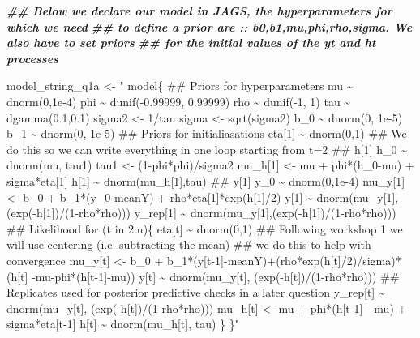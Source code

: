 \documentclass[
]{article}
\newenvironment{Shaded}{\begin{snugshade}}{\end{snugshade}}
\newcommand{\DocumentationTok}[1]{\textcolor[rgb]{0.56,0.35,0.01}{\textbf{\textit{#1}}}}
\newcommand{\NormalTok}[1]{#1}
\newcommand{\OtherTok}[1]{\textcolor[rgb]{0.56,0.35,0.01}{#1}}
\newcommand{\StringTok}[1]{\textcolor[rgb]{0.31,0.60,0.02}{#1}}
\begin{document}
\begin{Shaded}
\begin{Highlighting}[]
\DocumentationTok{\#\# Below we declare our model in JAGS, the hyperparameters for which we need  }
\DocumentationTok{\#\# to define a prior are :: b0,b1,mu,phi,rho,sigma. We also have to set priors}
\DocumentationTok{\#\# for the initial values of the yt and ht processes}
  
\NormalTok{model\_string\_q1a }\OtherTok{\textless{}{-}} \StringTok{" model\{}
\StringTok{  }
\StringTok{  \#\# Priors for hyperparameters}
\StringTok{  }
\StringTok{  mu \textasciitilde{} dnorm(0,1e{-}4)}
\StringTok{  phi \textasciitilde{} dunif({-}0.99999, 0.99999)}
\StringTok{  rho \textasciitilde{} dunif({-}1, 1)}
\StringTok{  }
\StringTok{  }
\StringTok{  tau \textasciitilde{} dgamma(0.1,0.1)}
\StringTok{  sigma2 \textless{}{-} 1/tau}
\StringTok{  sigma \textless{}{-} sqrt(sigma2)}
\StringTok{  }
\StringTok{  b\_0 \textasciitilde{} dnorm(0, 1e{-}5)}
\StringTok{  b\_1 \textasciitilde{} dnorm(0, 1e{-}5)}
\StringTok{  }
\StringTok{  \#\# Priors for initialiasations}
\StringTok{  }
\StringTok{  eta[1] \textasciitilde{} dnorm(0,1)}
\StringTok{  }
\StringTok{  \#\# We do this so we can write everything in one loop starting from t=2}
\StringTok{  }
\StringTok{  \#\# h[1]}
\StringTok{  h\_0 \textasciitilde{} dnorm(mu, tau1)}
\StringTok{  tau1 \textless{}{-} (1{-}phi*phi)/sigma2}
\StringTok{  mu\_h[1] \textless{}{-} mu + phi*(h\_0{-}mu) + sigma*eta[1]}
\StringTok{  h[1] \textasciitilde{} dnorm(mu\_h[1],tau)}
\StringTok{  }
\StringTok{  \#\# y[1]}
\StringTok{  y\_0 \textasciitilde{} dnorm(0,1e{-}4)}
\StringTok{  mu\_y[1] \textless{}{-} b\_0 + b\_1*(y\_0{-}meanY) + rho*eta[1]*exp(h[1]/2)}
\StringTok{  y[1] \textasciitilde{} dnorm(mu\_y[1],(exp({-}h[1])/(1{-}rho*rho))) }
\StringTok{  y\_rep[1] \textasciitilde{} dnorm(mu\_y[1],(exp({-}h[1])/(1{-}rho*rho)))}
\StringTok{  }
\StringTok{  \#\# Likelihood}
\StringTok{  }
\StringTok{  for (t in 2:n)\{}
\StringTok{  }
\StringTok{    eta[t] \textasciitilde{} dnorm(0,1)}
\StringTok{    }
\StringTok{    \#\# Following workshop 1 we will use centering (i.e. subtracting the mean)}
\StringTok{    \#\# we do this to help with convergence }
\StringTok{    }
\StringTok{    mu\_y[t] \textless{}{-} b\_0 + b\_1*(y[t{-}1]{-}meanY)+(rho*exp(h[t]/2)/sigma)*(h[t] {-}mu{-}phi*(h[t{-}1]{-}mu))}
\StringTok{    }
\StringTok{    y[t] \textasciitilde{} dnorm(mu\_y[t], (exp({-}h[t])/(1{-}rho*rho)))}
\StringTok{    }
\StringTok{    \#\# Replicates used for posterior predictive checks in a later question}
\StringTok{    y\_rep[t]  \textasciitilde{} dnorm(mu\_y[t], (exp({-}h[t])/(1{-}rho*rho)))}
\StringTok{    }
\StringTok{    mu\_h[t] \textless{}{-} mu + phi*(h[t{-}1] {-} mu) + sigma*eta[t{-}1]}
\StringTok{    h[t] \textasciitilde{} dnorm(mu\_h[t], tau)}
\StringTok{  \}}
\StringTok{  }
\StringTok{  }
\StringTok{  }
\StringTok{\}"}
\end{Highlighting}
\end{Shaded}
\end{document}
